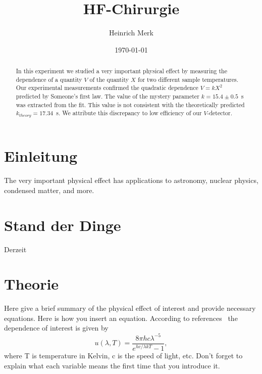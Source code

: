 \documentclass[letterpaper,12pt]{article}
\begin{document}
	
	\title{HF-Chirurgie}
	\author{Heinrich Merk}
	\date{\today}
	\maketitle
	
	\begin{abstract}
		In this experiment we studied a very important physical effect by measuring the
		dependence of a quantity $V$ of the quantity $X$ for two different sample
		temperatures.  Our experimental measurements confirmed the quadratic dependence
		$V = kX^2$ predicted by Someone's first law. The value of the mystery parameter
		$k = 15.4\pm 0.5$~s was extracted from the fit. This value is
		not consistent with the theoretically predicted $k_{theory}=17.34$~s. We attribute this
		discrepancy to low efficiency of our $V$-detector.
		
	\end{abstract}
	
	\section{Einleitung}
	
	The very important physical effect has applications to astronomy, nuclear physics, condensed matter, and more. 
	
	\section{Stand der Dinge}
	
	Derzeit
	
	
	\section{Theorie}
	
	Here give a brief summary of the physical effect of interest and provide
	necessary equations. Here is how you insert an equation. According to
	references~\cite{melissinos, Cyr, Wiki} the dependence of interest is given
	by
	\begin{equation} \label{eq:aperp} %
		u(\lambda,T)=\frac{8\pi hc\lambda^{-5}}{e^{hc/\lambda kT}-1},
	\end{equation}
	where T is temperature in Kelvin, c is the speed of light, etc. Don't forget to
	explain what each variable means the first time that you introduce it.
	
\end{document}
